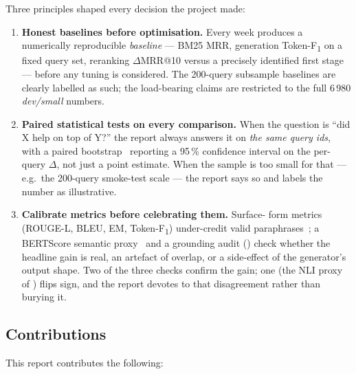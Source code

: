 \documentclass[11pt,a4paper]{article}
\makeatletter
\newcommand{\devsmall}{\textit{dev/small}}
\newcommand{\fdev}{6\,980}
\newcommand{\F}{F\textsubscript{1}}
\newcommand{\Tokenf}{Token-\F}
\newcommand{\rougel}{ROUGE-L}
\newcommand{\mrr}{MRR@10}
\newcommand{\bmtwofive}{BM25}
\makeatother
\begin{document}
Three principles shaped every decision the project made:

\begin{enumerate}
  \item \textbf{Honest baselines before optimisation.}  Every week
        produces a numerically reproducible \emph{baseline} ---
        \bmtwofive{} MRR, generation \Tokenf{} on a fixed query set,
        reranking $\Delta$\mrr{} versus a precisely identified first
        stage --- before any tuning is considered.  The 200-query
        subsample baselines are clearly labelled as such; the
        load-bearing claims are restricted to the full \fdev{}
        \devsmall{} numbers.
  \item \textbf{Paired statistical tests on every comparison.}  When
        the question is ``did X help on top of Y?'' the report
        always answers it on \emph{the same query ids}, with a paired
        bootstrap~\cite{koehn2004bootstrap} reporting a 95\,\%
        confidence interval on the per-query $\Delta$, not just a
        point estimate.  When the sample is too small for that ---
        e.g.\ the 200-query smoke-test scale --- the report says so
        and labels the number as illustrative.
  \item \textbf{Calibrate metrics before celebrating them.}  Surface-
        form metrics (\rougel{}, BLEU, EM, \Tokenf{}) under-credit
        valid paraphrases~\cite{lin2004rouge,papineni2002bleu}; a
        BERTScore semantic proxy~\cite{zhang2020bertscore} and a
        grounding audit () check whether the headline
        gain is real, an artefact of overlap, or a side-effect of
        the generator's output shape.  Two of the three checks
        confirm the gain; one (the NLI proxy of )
        flips sign, and the report devotes
         to that disagreement rather
        than burying it.
\end{enumerate}

\subsection{Contributions}

This report contributes the following:
\end{document}
